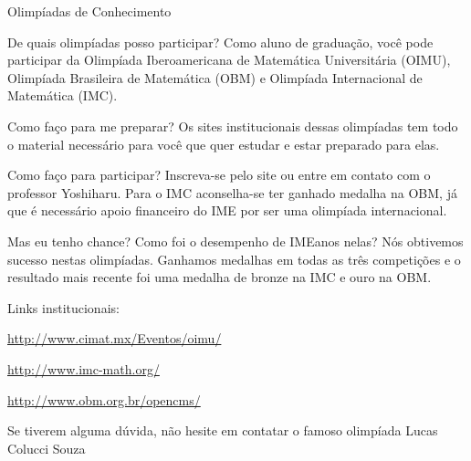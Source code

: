 \begin{secao}{Olimpíadas de Conhecimento}
\begin{itemize}
De quais olimpíadas posso participar? Como aluno de graduação, você pode
participar da Olimpíada Iberoamericana de Matemática Universitária (OIMU),
Olimpíada Brasileira de Matemática (OBM) e Olimpíada Internacional de 
Matemática (IMC).

Como faço para me preparar? Os sites institucionais dessas olimpíadas
tem todo o material necessário para você que quer estudar e estar preparado
para elas.

Como faço para participar? Inscreva-se pelo site ou entre em contato com
o professor Yoshiharu. Para o IMC aconselha-se ter ganhado medalha na OBM,
já que é necessário apoio financeiro do IME por ser uma olimpíada internacional.

Mas eu tenho chance? Como foi o desempenho de IMEanos nelas? Nós obtivemos
sucesso nestas olimpíadas. Ganhamos medalhas em todas as três competições e
o resultado mais recente foi uma medalha de bronze na IMC e ouro na OBM.

Links institucionais:

\url{http://www.cimat.mx/Eventos/oimu/}

\url{http://www.imc-math.org/}

\url{http://www.obm.org.br/opencms/}

Se tiverem alguma dúvida, não hesite em contatar o famoso olimpíada Lucas Colucci Souza

\end{itemize}

\end{secao}
